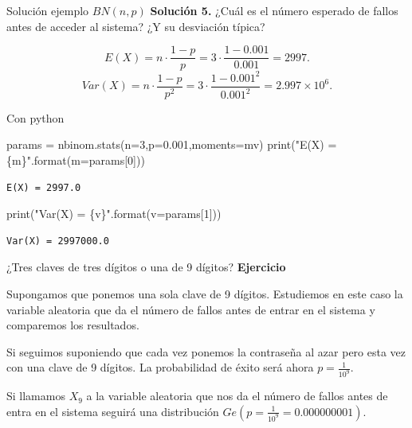 \documentclass[
  ignorenonframetext,
  aspectratio=169]{beamer}
\newenvironment{Shaded}{\begin{snugshade}}{\end{snugshade}}
\newcommand{\BuiltInTok}[1]{\textcolor[rgb]{0.00,0.23,0.31}{#1}}
\newcommand{\DecValTok}[1]{\textcolor[rgb]{0.68,0.00,0.00}{#1}}
\newcommand{\FloatTok}[1]{\textcolor[rgb]{0.68,0.00,0.00}{#1}}
\newcommand{\NormalTok}[1]{\textcolor[rgb]{0.00,0.23,0.31}{#1}}
\newcommand{\OperatorTok}[1]{\textcolor[rgb]{0.37,0.37,0.37}{#1}}
\newcommand{\SpecialCharTok}[1]{\textcolor[rgb]{0.37,0.37,0.37}{#1}}
\newcommand{\StringTok}[1]{\textcolor[rgb]{0.13,0.47,0.30}{#1}}
\begin{document}
\begin{frame}[fragile]{Solución ejemplo \(BN(n,p)\)}
\protect\hypertarget{soluciuxf3n-ejemplo-bnnp-3}{}
\textbf{Solución 5.} ¿Cuál es el número esperado de fallos antes de
acceder al sistema? ¿Y su desviación típica?

\[E(X)=n\cdot \frac{1-p}{p}=3\cdot \frac{1- 0.001}{0.001}=2997.\]
\[Var(X)=n\cdot \frac{1-p}{p^2}=3\cdot \frac{1- 0.001^2}{0.001^2}=\ensuremath{2.997\times 10^{6}}.\]

Con python

\begin{Shaded}
\begin{Highlighting}[]
\NormalTok{params }\OperatorTok{=}\NormalTok{ nbinom.stats(n}\OperatorTok{=}\DecValTok{3}\NormalTok{,p}\OperatorTok{=}\FloatTok{0.001}\NormalTok{,moments}\OperatorTok{=}\StringTok{\textquotesingle{}mv\textquotesingle{}}\NormalTok{)}
\BuiltInTok{print}\NormalTok{(}\StringTok{"E(X) = }\SpecialCharTok{\{m\}}\StringTok{"}\NormalTok{.}\BuiltInTok{format}\NormalTok{(m}\OperatorTok{=}\NormalTok{params[}\DecValTok{0}\NormalTok{]))}
\end{Highlighting}
\end{Shaded}

\begin{verbatim}
E(X) = 2997.0
\end{verbatim}

\begin{Shaded}
\begin{Highlighting}[]
\BuiltInTok{print}\NormalTok{(}\StringTok{"Var(X) = }\SpecialCharTok{\{v\}}\StringTok{"}\NormalTok{.}\BuiltInTok{format}\NormalTok{(v}\OperatorTok{=}\NormalTok{params[}\DecValTok{1}\NormalTok{]))}
\end{Highlighting}
\end{Shaded}

\begin{verbatim}
Var(X) = 2997000.0
\end{verbatim}
\end{frame}

\begin{frame}{¿Tres claves de tres dígitos o una de 9 dígitos?}
\protect\hypertarget{tres-claves-de-tres-duxedgitos-o-una-de-9-duxedgitos}{}
\textbf{Ejercicio}

Supongamos que ponemos una sola clave de 9 dígitos. Estudiemos en este
caso la variable aleatoria que da el número de fallos antes de entrar en
el sistema y comparemos los resultados.

Si seguimos suponiendo que cada vez ponemos la contraseña al azar pero
esta vez con una clave de 9 dígitos. La probabilidad de éxito será ahora
\(p=\frac{1}{10^{9}}\).

Si llamamos \(X_9\) a la variable aleatoria que nos da el número de
fallos antes de entra en el sistema seguirá una distribución
\(Ge(p=\frac{1}{10^9}=0.000000001)\).
\end{frame}
\end{document}
